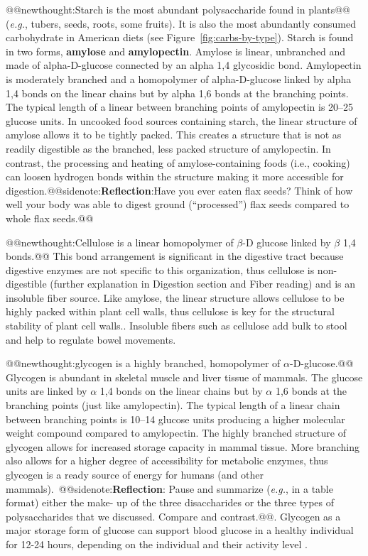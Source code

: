 \documentclass{tufte-handout}
\makeatletter
\def\newthought#1{@@newthought:#1@@}
\def\sidenote#1{@@sidenote:#1@@}
\makeatother
\begin{document}
\newthought{Starch is the most abundant polysaccharide found in plants} (\textit{e.g.}, tubers, seeds, roots, some fruits). It is also the most abundantly consumed carbohydrate in American diets (see Figure~\ref{fig:carbs-by-type}). Starch is found in two forms, \textbf{amylose} and \textbf{amylopectin}. Amylose is linear, unbranched and made of alpha-D-glucose connected by an alpha 1,4 glycosidic bond. Amylopectin is moderately branched and a homopolymer of alpha-D-glucose linked by alpha 1,4 bonds on the linear chains but by alpha 1,6 bonds at the branching points. The typical length of a linear  between branching points of amylopectin is 20--25 glucose units. In uncooked food sources containing starch, the linear structure of amylose allows it to be tightly packed. This creates a structure that is not as readily digestible as the branched, less packed structure of amylopectin.  In contrast, the processing and heating of amylose-containing foods (i.e., cooking) can loosen hydrogen bonds within the structure making it more accessible for digestion.\sidenote{\textbf{Reflection}:Have you ever eaten flax seeds? Think of how well your body was able to digest ground (``processed'') flax seeds compared to whole flax seeds.}

\newthought{Cellulose is a linear homopolymer of $\beta$-D glucose linked by $\beta$ 1,4 bonds.} This bond arrangement is significant in the digestive
tract because digestive enzymes are not specific to this organization, thus cellulose is non-digestible (further explanation in Digestion section and Fiber reading) and is an insoluble fiber source. Like amylose, the linear structure allows cellulose to be highly packed within plant cell walls, thus cellulose is key for the structural stability of plant cell walls..  Insoluble fibers such as cellulose add bulk to stool and help to regulate bowel movements.


\newthought{glycogen is a highly branched, homopolymer of $\alpha$-D-glucose.} Glycogen is abundant in skeletal muscle and liver tissue of mammals. The glucose units are linked by $\alpha$ 1,4 bonds on the linear chains but by $\alpha$ 1,6 bonds at the branching points (just like amylopectin). The typical length of a linear chain between branching points is 10--14 glucose units producing a higher molecular weight compound compared to amylopectin. The highly branched structure of glycogen allows for increased storage capacity in mammal tissue. More branching also allows for a higher degree of accessibility for metabolic enzymes, thus glycogen is a ready source of energy for humans (and other mammals).\  \sidenote{\textbf{Reflection}: Pause and summarize (\textit{e.g.}, in a table format) either the make- up of the three disaccharides or the three types of polysaccharides that we discussed. Compare and contrast.}. Glycogen as a major storage form of glucose can support blood glucose in a healthy individual for 12-24 hours, depending on the individual and their activity level \citep{hortonProlongedFastingSignificantly2001}.  
\end{document}

